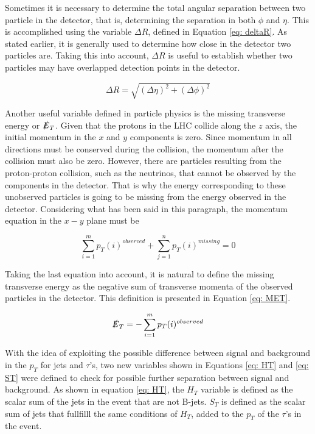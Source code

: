 Sometimes it is necessary to determine the total angular separation between two particle in the detector, that is, determining the separation in both $\phi$ and $\eta$. This is accomplished using the variable $\Delta R$, defined in Equation \ref{eq: deltaR}. As stated earlier, it is generally used to determine how close in the detector two particles are. Taking this into account, $\Delta R$ is useful to establish whether two particles may have overlapped detection points in the detector. 

\begin{equation}\label{eq: deltaR}
\Delta R = \sqrt{\left(\Delta \eta\right)^{2} + \left(\Delta \phi \right)^{2}}
\end{equation}

Another useful variable defined in particle physics is the missing transverse energy or $\slashed{E}_{T}$. Given that the protons in the LHC collide along the $z$ axis, the initial momentum in the $x$ and $y$ components is zero. Since momentum in all directions must be conserved during the collision, the momentum after the collision must also be zero. However, there are particles resulting from the proton-proton collision, such as the neutrinos, that cannot be observed by the components in the detector. That is why the energy corresponding to these unobserved particles is going to be missing from the energy observed in the detector. Considering what has been said in this paragraph, the momentum equation in the $x-y$ plane must be

$$ \sum_{i=1}^{m} p_{T}(i)^{observed} + \sum_{j=1}^{n} p_{T}(i)^{missing} = 0 $$

Taking the last equation into account, it is natural to define the missing transverse energy as the negative sum of transverse momenta of the observed particles in the detector. This definition is presented in Equation \ref{eq: MET}.

\begin{equation}\label{eq: MET}
\slashed{E}_{T} = -\sum_{i=1}^{m} p_{T}(i)^{observed}
\end{equation} 

With the idea of exploiting the possible difference between signal and background in the $p_{T}$ for jets and $\tau$'s, two new variables shown in Equations \ref{eq: HT} and \ref{eq: ST} were defined to check for possible further separation between signal and background. As shown in equation \ref{eq: HT}, the $H_{T}$ variable is defined as the scalar sum of the jets in the event that are not B-jets. $S_{T}$ is defined as the scalar sum of jets that fullfilll the same conditions of $H_{T}$, added to the $p_{T}$ of the $\tau$'s in the event.



